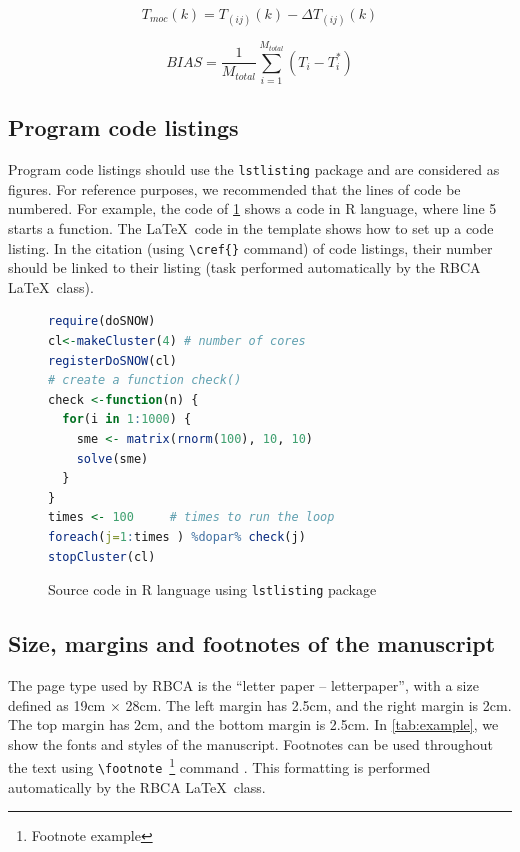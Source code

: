 \documentclass[alpha-refs,english]{RBCA_v3.0}
\begin{document}
\begin{equation}
	T_{moc}(\textit{k}) =  T_{(ij)}(\textit{k}) - \Delta T_{(ij)} (\textit{k})
\label{eq:example2}
\end{equation}

\begin{equation}
BIAS = \frac{1}{M_{total} }\sum_{i=1}^{M_{total}} (T_{i} - T^{*}_{i})
\label{eq:example3}
\end{equation}


\subsection{Program code listings}

Program code listings should use the \verb|lstlisting| package and are considered as figures. For reference purposes, we recommended that the lines of code be numbered. For example, the code of \cref{lst:R_code} shows a code in R language, where line 5 starts a function. The \LaTeX\ code in the template shows how to set up a code listing. In the citation (using \verb|\cref{}| command) of code listings, their number should be linked to their listing (task performed automatically by the RBCA \LaTeX\ class).

\begin{figure}[hb!]
\begin{lstlisting}[language=R]
require(doSNOW)
cl<-makeCluster(4) # number of cores
registerDoSNOW(cl)
# create a function check()
check <-function(n) {
  for(i in 1:1000) {
    sme <- matrix(rnorm(100), 10, 10)
    solve(sme)
  }
}
times <- 100     # times to run the loop
foreach(j=1:times ) %dopar% check(j)
stopCluster(cl)
\end{lstlisting}	
\caption{Source code in R language using \texttt{lstlisting} package}
\label{lst:R_code}
\end{figure}


\subsection{Size, margins and footnotes of the manuscript}
The page type used by RBCA is the ``letter paper -- letterpaper'', with a size defined as 19cm $\times$ 28cm. The left margin has 2.5cm, and the right margin is 2cm. The top margin has 2cm, and the bottom margin is 2.5cm. In \cref{tab:example}, we show the fonts and styles of the manuscript. Footnotes can be used throughout the text using \verb|\footnote|~\footnote{Footnote example} command . This formatting is performed automatically by the RBCA \LaTeX\ class.
\end{document}
